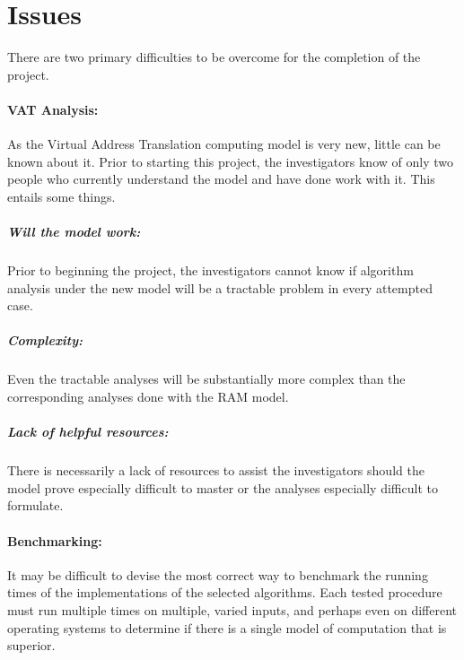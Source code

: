 \section{Issues}
  There are two primary difficulties to be overcome for the completion of the
  project.
  \paragraph{VAT Analysis:} As the Virtual Address Translation computing model
  is very new, little can be known about it. Prior to starting this project,
  the investigators know of only two people who currently understand the model
  and have done work with it. This entails some things.
    \subparagraph{Will the model work:} Prior to beginning the project, the
    investigators cannot know if algorithm analysis under the new model will be
    a tractable problem in every attempted case.
    \subparagraph{Complexity:} Even the tractable analyses will be
    substantially more complex than the corresponding analyses done with the
    RAM model.
    \subparagraph{Lack of helpful resources:} There is necessarily a lack of
    resources to assist the investigators should the model prove especially
    difficult to master or the analyses especially difficult to formulate.
  \paragraph{Benchmarking:} It may be difficult to devise the most correct way
  to benchmark the running times of the implementations of the selected
  algorithms. Each tested procedure must run multiple times on multiple, varied
  inputs, and perhaps even on different operating systems to determine if
  there is a single model of computation that is superior.